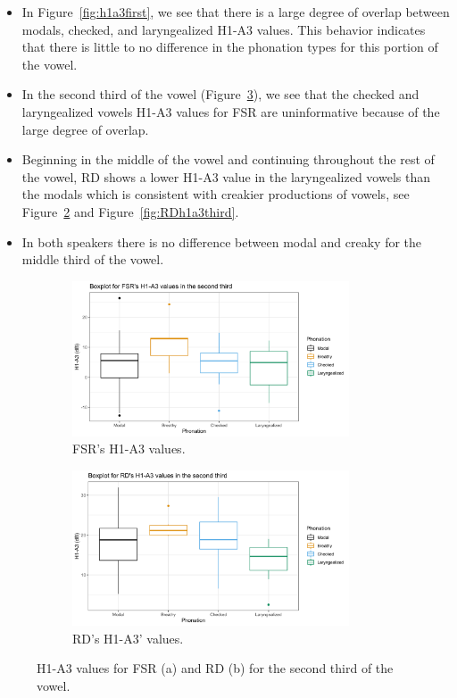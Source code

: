 \documentclass[12pt, letterpaper]{article}
\begin{document}
\begin{itemize}
	\item In Figure~\ref{fig:h1a3first}, we see that there is a large degree of overlap between modals, checked, and laryngealized H1-A3 values. This behavior indicates that there is little to no difference in the phonation types for this portion of the vowel. 
	\item In the second third of the vowel (Figure~\ref{fig:h1a3second}), we see that the checked and laryngealized vowels H1-A3 values for FSR are uninformative because of the large degree of overlap.
	\item Beginning in the middle of the vowel and continuing throughout the rest of the vowel, RD shows a lower H1-A3 value in the laryngealized vowels than the modals which is consistent with creakier productions of vowels, see Figure~\ref{fig:RDh1a3second} and Figure~\ref{fig:RDh1a3third}.
	\item In both speakers there is no difference between modal and creaky for the middle third of the vowel. 
\end{itemize}
\begin{figure}[!h]
	\centering
	\begin{subfigure}{.5\textwidth}
		\centering
		\includegraphics[width=0.9\textwidth]{../mean_FSR_h1a3_Second.png}
		\caption{FSR's H1-A3 values.}
		\label{fig:FSRh1a3second} 
	\end{subfigure}%
	\begin{subfigure}{.5\textwidth}
		\centering
		\includegraphics[width=0.9\textwidth]{../mean_RD_h1a3_Second.png}
		\caption{RD's H1-A3' values.}
		\label{fig:RDh1a3second} 
	\end{subfigure}
	\caption{H1-A3 values for FSR (a) and RD (b) for the second third of the vowel. }
	\label{fig:h1a3second}
\end{figure}
\end{document}
